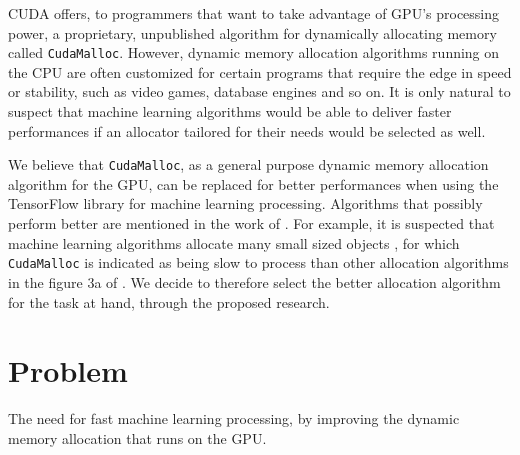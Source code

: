 \documentclass[12pt,twoside]{article}
\begin{document}


CUDA offers, to programmers that want to take advantage of GPU's processing power, a proprietary, unpublished algorithm for dynamically allocating memory called \texttt{CudaMalloc}. However, dynamic memory allocation algorithms running on the CPU are often customized for certain programs that require the edge in speed or stability, such as video games, database engines and so on. It is only natural to suspect that machine learning algorithms would be able to deliver faster performances if an allocator tailored for their needs would be selected as well.

We believe that \texttt{CudaMalloc}, as a general purpose dynamic memory allocation algorithm for the GPU, can be replaced for better performances when using the TensorFlow \cite{abadi2016} library for machine learning processing. Algorithms that possibly perform better are mentioned in the work of \citeauthor{Vinkler2015} \cite{Vinkler2015}. For example, it is suspected that machine learning algorithms allocate many small sized objects \cite{YOU2015}, for which \texttt{CudaMalloc} is indicated as being slow to process than other allocation algorithms in the figure 3a of \cite{Vinkler2015}. We decide to therefore select the better allocation algorithm for the task at hand, through the proposed research.

\section{Problem}
\label{sec:problem}



The need for fast machine learning processing, by improving the dynamic memory allocation that runs on the GPU.

\end{document}
